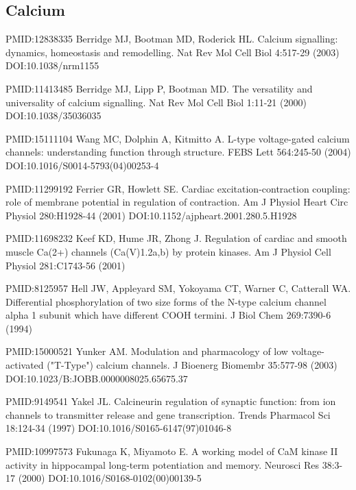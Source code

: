 \begin{thebibliography}{00}
\section{Calcium} 

PMID:12838335
 Berridge MJ, Bootman MD, Roderick HL.
\newblock Calcium signalling: dynamics, homeostasis and remodelling.
\newblock Nat Rev Mol Cell Biol 4:517-29 (2003) DOI:10.1038/nrm1155

PMID:11413485
 Berridge MJ, Lipp P, Bootman MD.
\newblock The versatility and universality of calcium signalling.
\newblock Nat Rev Mol Cell Biol 1:11-21 (2000) DOI:10.1038/35036035

PMID:15111104
 Wang MC, Dolphin A, Kitmitto A.
\newblock L-type voltage-gated calcium channels: understanding function through structure.
\newblock FEBS Lett 564:245-50 (2004) DOI:10.1016/S0014-5793(04)00253-4

PMID:11299192
 Ferrier GR, Howlett SE.
\newblock Cardiac excitation-contraction coupling: role of membrane potential in regulation of contraction.
\newblock Am J Physiol Heart Circ Physiol 280:H1928-44 (2001) DOI:10.1152/ajpheart.2001.280.5.H1928

PMID:11698232
 Keef KD, Hume JR, Zhong J.
\newblock Regulation of cardiac and smooth muscle Ca(2+) channels (Ca(V)1.2a,b) by protein kinases.
\newblock Am J Physiol Cell Physiol 281:C1743-56 (2001)

PMID:8125957
 Hell JW, Appleyard SM, Yokoyama CT, Warner C, Catterall WA.
\newblock Differential phosphorylation of two size forms of the N-type calcium channel alpha 1 subunit which have different COOH termini.
\newblock J Biol Chem 269:7390-6 (1994)

PMID:15000521
 Yunker AM.
\newblock Modulation and pharmacology of low voltage-activated ("T-Type") calcium channels.
\newblock J Bioenerg Biomembr 35:577-98 (2003) DOI:10.1023/B:JOBB.0000008025.65675.37

PMID:9149541
 Yakel JL.
\newblock Calcineurin regulation of synaptic function: from ion channels to transmitter release and gene transcription.
\newblock Trends Pharmacol Sci 18:124-34 (1997) DOI:10.1016/S0165-6147(97)01046-8

PMID:10997573
 Fukunaga K, Miyamoto E.
\newblock A working model of CaM kinase II activity in hippocampal long-term potentiation and memory.
\newblock Neurosci Res 38:3-17 (2000) DOI:10.1016/S0168-0102(00)00139-5


\end{thebibliography}
